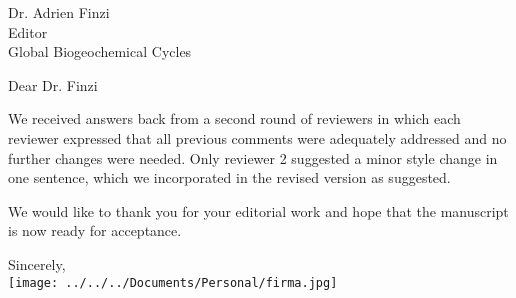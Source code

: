\documentclass[11pt]{bgcletter}
\begin{document}
\begin{letter}{Dr. Adrien Finzi\\
 Editor \\ Global Biogeochemical Cycles}

\opening{Dear Dr. Finzi}
We received answers back from a second round of reviewers in which each reviewer expressed that all previous comments were adequately addressed and no further changes were needed. Only reviewer 2 suggested a minor style change in one sentence, which we incorporated in the revised version as suggested. 

We would like to thank you for your editorial work and hope that the manuscript is now ready for acceptance. 


\closing{Sincerely, \\
 \texttt{[image: ../../../Documents/Personal/firma.jpg]}
 }
 \end{letter}

 
\end{document}
